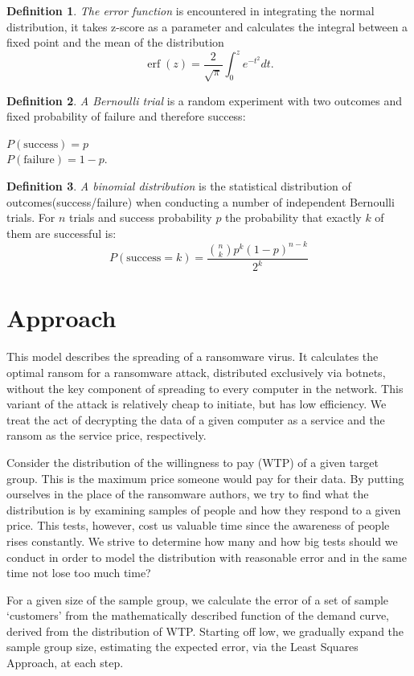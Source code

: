 \documentclass[11pt, a4paper]{article}
\theoremstyle{definition}
\newtheorem{definition}{Definition}
\begin{document}
		\begin{definition}
			\label{def:err}
			\emph{The error function} is encountered in integrating the normal distribution, it takes z-score as a parameter and calculates the integral between a fixed point and the mean of the distribution
			$$\operatorname{erf}(z)=\dfrac{2}{\sqrt{\pi}}\int_{0}^{z}e^{-t^{2}}dt.$$
		\end{definition}
		\newpage
		\begin{definition}
			\label{def:Bernoulli_trial}
			\emph{A Bernoulli trial} is a random experiment with two outcomes and fixed probability of failure and therefore success:
			\begin{center}
			$P(\text{success})=p$\\
			$P(\text{failure})=1-p.$
			\end{center}
		\end{definition}
	
		\begin{definition}
			\label{def:Binomial_distribution}
			\emph{A binomial distribution} is the statistical distribution of outcomes(success/failure) when conducting a number of independent Bernoulli trials.
			For $n$ trials and success probability $p$ the probability that exactly $k$ of them are successful is:
			$$
			P(\text{success} = k) = \frac{\binom{n}{k}p^{k}(1-p)^{n-k}}{2^k}
			$$
		\end{definition}
	
	\section{Approach}
		This model describes the spreading of a ransomware virus. It calculates the optimal ransom for a ransomware attack, distributed exclusively via botnets, without the key component of spreading to every computer in the network. This variant of the attack is relatively cheap to initiate, but has low efficiency.	We treat the act of decrypting the data of a given computer as a service and the ransom as the service price, respectively. \par
		Consider the distribution of the willingness to pay (WTP) of a given target group. This is the maximum price someone would pay for their data. By putting ourselves in the place of the ransomware authors, we try to find what the distribution is by examining samples of people and how they respond to a given price. This tests, however, cost us valuable time since the awareness of people rises constantly. We strive to determine how many and how big tests should we conduct in order to model the distribution with reasonable error and in the same time not lose too much time?\par
		For a given size of the sample group, we calculate the error of a set of sample `customers' from the mathematically described function of the demand curve, derived from the distribution of WTP. Starting off low, we gradually expand the sample group size, estimating the expected error, via the Least Squares Approach, at each step.
\end{document}
